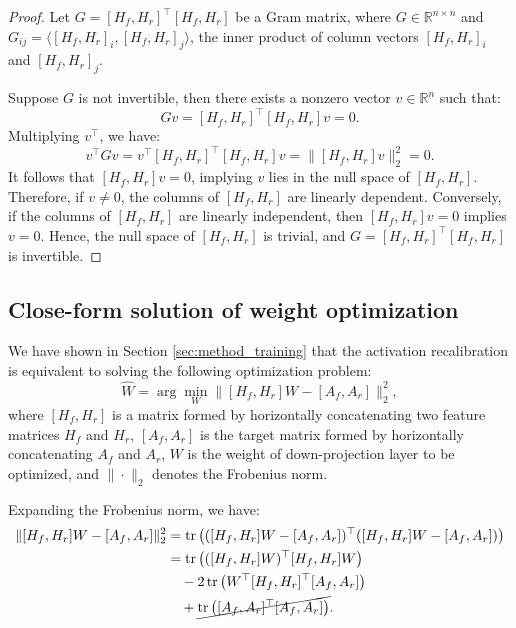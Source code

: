 \begin{proof}
Let \(G = [H_f, H_r]^\top [H_f, H_r] \) be a Gram matrix, where \( G \in \mathbb{R}^{n \times n} \) and \( G_{ij} = \langle [H_f, H_r]_i, [H_f, H_r]_j \rangle \), the inner product of column vectors \( [H_f, H_r]_i \) and \( [H_f, H_r]_j \).

   
Suppose \( G \) is not invertible, then there exists a nonzero vector \( v \in \mathbb{R}^n \) such that:
     \[
     G v = [H_f, H_r]^\top [H_f, H_r] v = 0.
     \]
Multiplying \( v^\top \), we have:
     \[
     v^\top G v = v^\top [H_f, H_r]^\top [H_f, H_r] v = \| [H_f, H_r] v \|_2^2 = 0.
     \]
It follows that \( [H_f, H_r] v = 0 \), implying \( v \) lies in the null space of \( [H_f, H_r] \). Therefore, if \( v \neq 0 \), the columns of \( [H_f, H_r] \) are linearly dependent. Conversely, if the columns of \( [H_f, H_r] \) are linearly independent, then \( [H_f, H_r] v = 0 \) implies \( v = 0 \). Hence, the null space of \( [H_f, H_r] \) is trivial, and \( G = [H_f, H_r]^\top [H_f, H_r] \) is invertible.
\end{proof}


\subsection{Close-form solution of weight optimization}\label{app:closed_form_solution_proof}
We have shown in Section \ref{sec:method_training} that the activation recalibration is equivalent to solving the following optimization problem:
\[
\widehat{W} = \arg\min_{W} \| [H_f, H_r] W - [A_f, A_r] \|_2^2,
\]
where \( [H_f, H_r] \) is a matrix formed by horizontally concatenating two feature matrices \( H_f \) and \( H_r \), \( [A_f, A_r] \) is the target matrix formed by horizontally concatenating \( A_f \) and \( A_r \), \( W \) is the weight of down-projection layer to be optimized, and \( \| \cdot \|_2 \) denotes the Frobenius norm.

Expanding the Frobenius norm, we have:
\begin{align*}
\| [H_f, H_r] W - [A_f, A_r] \|_2^2 
&= \text{tr} \left( ([H_f, H_r] W - [A_f, A_r])^\top ([H_f, H_r] W - [A_f, A_r]) \right) \\
&= \text{tr} \left( ([H_f, H_r] W)^\top [H_f, H_r] W \right) \\
&\quad - 2 \, \text{tr} \left( W^\top [H_f, H_r]^\top [A_f, A_r] \right) \\
&\quad + \cancel{\text{tr} \left( [A_f, A_r]^\top [A_f, A_r] \right)}.
\end{align*}

